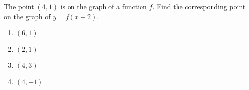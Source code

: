 
\bigskip

\item The point $(4,1)$ is on the graph of a function $f$.  Find the corresponding point on the graph of $y = f(x-2)$.
	
	\begin{enumerate}
		\item $(6,1)$
		\item $(2,1)$
		\item $(4,3)$
		\item $(4,-1)$
	\end{enumerate}
	

